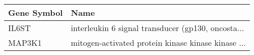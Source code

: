 \begin{tabular}{ll}
\toprule
Gene Symbol &                                               Name \\
\midrule
      IL6ST & interleukin 6 signal transducer (gp130, oncosta... \\
     MAP3K1 & mitogen-activated protein kinase kinase kinase ... \\
\bottomrule
\end{tabular}
